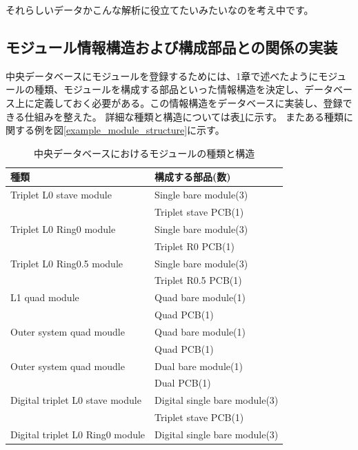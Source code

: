 それらしいデータかこんな解析に役立てたいみたいなのを考え中です。

\subsection{モジュール情報構造および構成部品との関係の実装}
中央データベースにモジュールを登録するためには、1章で述べたようにモジュールの種類、モジュールを構成する部品といった情報構造を決定し、データベース上に定義しておく必要がある。この情報構造をデータベースに実装し、登録できる仕組みを整えた。
詳細な種類と構造については表\ref{pd_module_structure}に示す。
またある種類に関する例を図\ref{example_module_structure}に示す。

\begin{table}[tbp]
\begin{center}
\caption[中央データベースにおけるモジュールの種類と構造]{中央データベースにおけるモジュールの種類と構造}
\label{pd_module_structure}
  \begin{tabular}{|ll|} \hline
    種類 & 構成する部品(数) \\ \hline
    Triplet L0 stave module   &  Single bare module(3) \\
                              &  Triplet stave PCB(1) \\\hline
    Triplet L0 Ring0 module   &  Single bare module(3) \\
                              &  Triplet R0 PCB(1) \\\hline
    Triplet L0 Ring0.5 module &  Single bare module(3) \\
                              &  Triplet R0.5 PCB(1) \\\hline
    L1 quad module            &  Quad bare module(1) \\
                              &  Quad PCB(1) \\\hline
    Outer system quad moudle  &  Quad bare module(1) \\
                              &  Quad PCB(1) \\\hline
    Outer system quad moudle  &  Dual bare module(1) \\
                              &  Dual PCB(1) \\\hline
    Digital triplet L0 stave module   &  Digital single bare module(3) \\
                                      &  Triplet stave PCB(1) \\\hline
    Digital triplet L0 Ring0 module   &  Digital single bare module(3) \\

\end{tabular}
\end{center}
\end{table}
